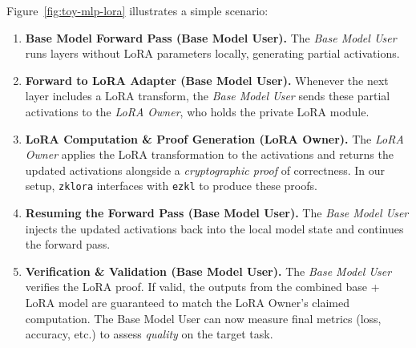 \documentclass[11pt]{article}
\begin{document}
Figure~\ref{fig:toy-mlp-lora} illustrates a simple scenario:
\begin{enumerate}
    \item \textbf{Base Model Forward Pass (Base Model User).}
    The \emph{Base Model User} runs layers without LoRA parameters locally, generating partial activations.

    \item \textbf{Forward to LoRA Adapter (Base Model User).}
    Whenever the next layer includes a LoRA transform, the \emph{Base Model User} sends these partial activations to the \emph{LoRA Owner}, who holds the private LoRA module.

    \item \textbf{LoRA Computation \& Proof Generation (LoRA Owner).}
    The \emph{LoRA Owner} applies the LoRA transformation to the activations and returns the updated activations alongside a \emph{cryptographic proof} of correctness. In our setup, \texttt{zklora} interfaces with \texttt{ezkl} to produce these proofs.

    \item \textbf{Resuming the Forward Pass (Base Model User).}
    The \emph{Base Model User} injects the updated activations back into the local model state and continues the forward pass. 

    \item \textbf{Verification \& Validation (Base Model User).}
    The \emph{Base Model User} verifies the LoRA proof. If valid, the outputs from the combined base + LoRA model are guaranteed to match the LoRA Owner’s claimed computation. The Base Model User can now measure final metrics (loss, accuracy, etc.) to assess \emph{quality} on the target task.
\end{enumerate}
\end{document}
